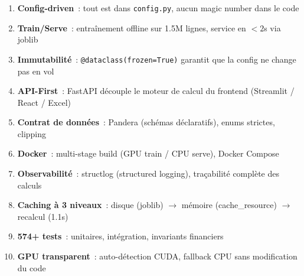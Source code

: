 \documentclass[12pt,a4paper]{article}
\begin{document}
\begin{interpretbox}
\begin{enumerate}[noitemsep]
    \item \textbf{Config-driven}~: tout est dans \texttt{config.py}, aucun magic number dans le code
    \item \textbf{Train/Serve}~: entra\^inement offline sur 1.5M lignes, service en $< 2$s via joblib
    \item \textbf{Immutabilit\'e}~: \texttt{@dataclass(frozen=True)} garantit que la config ne change pas en vol
    \item \textbf{API-First}~: FastAPI d\'ecouple le moteur de calcul du frontend (Streamlit / React / Excel)
    \item \textbf{Contrat de donn\'ees}~: Pandera (sch\'emas d\'eclaratifs), enums strictes, clipping
    \item \textbf{Docker}~: multi-stage build (GPU train / CPU serve), Docker Compose
    \item \textbf{Observabilit\'e}~: structlog (structured logging), tra\c{c}abilit\'e compl\`ete des calculs
    \item \textbf{Caching \`a 3 niveaux}~: disque (joblib) $\to$ m\'emoire (cache\_resource) $\to$ recalcul (1.1s)
    \item \textbf{574+ tests}~: unitaires, int\'egration, invariants financiers
    \item \textbf{GPU transparent}~: auto-d\'etection CUDA, fallback CPU sans modification du code
\end{enumerate}
\end{interpretbox}
\end{document}
